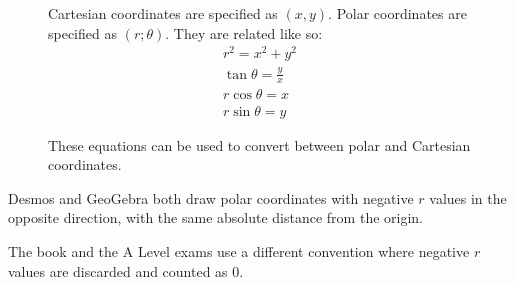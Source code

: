 \documentclass[../main.tex]{subfile}
\begin{document}
\tikzset{/tkzmkangle/mark=none}



\begin{figure}[H]
	\begin{minipage}{0.45\linewidth}
	\begin{center}
	\end{center}
	\end{minipage}\hfill
	\begin{minipage}{0.5\linewidth}
		\setlength{\parskip}{1em}
		Cartesian coordinates are specified as $(x, y)$. Polar coordinates are specified as $(r; \theta)$. They are related like so:
		\begin{eqnarray*}
			\displaystyle
			r^2 = x^2 + y^2\\
			\tan\theta = \frac{y}{x}\\
			r\cos\theta = x\\
			r\sin\theta = y
		\end{eqnarray*}

		These equations can be used to convert between polar and Cartesian coordinates.
	\end{minipage}
\end{figure}


Desmos and GeoGebra both draw polar coordinates with negative $r$ values in the opposite direction, with the same absolute distance from the origin.

The book and the A Level exams use a different convention where negative $r$ values are discarded and counted as 0.
\end{document}
